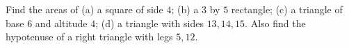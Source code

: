 Find the areas of (a) a square of side $4$; (b) a $3$ by $5$ rectangle; (c) a triangle of base $6$ and altitude $4$; (d) a triangle with sides $13,14,15$. Also find the hypotenuse of a right triangle with legs $5,12$.
